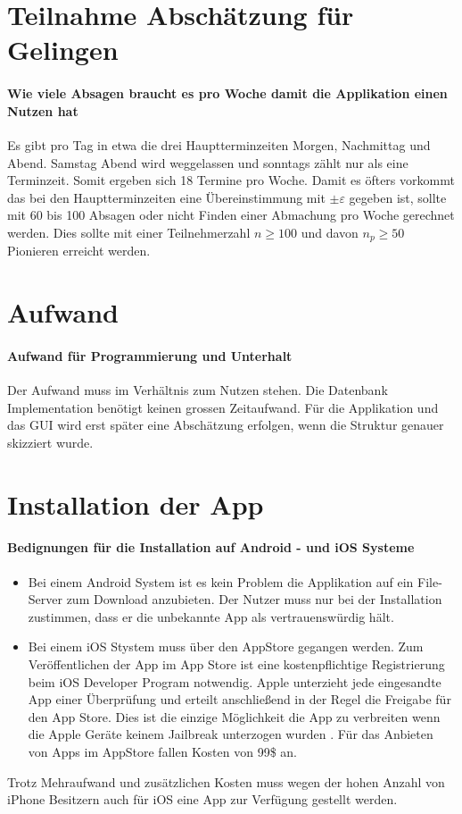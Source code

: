\section{Teilnahme Abschätzung für Gelingen}
\paragraph{Wie viele Absagen braucht es pro Woche damit die Applikation einen Nutzen hat} Es gibt pro Tag in etwa die drei Hauptterminzeiten Morgen, Nachmittag und Abend. Samstag Abend wird weggelassen und sonntags zählt nur als eine Terminzeit. Somit ergeben sich 18 Termine pro Woche. Damit es öfters vorkommt das bei den Hauptterminzeiten eine Übereinstimmung mit $\pm\varepsilon$ gegeben ist, sollte mit 60 bis 100 Absagen oder nicht Finden einer Abmachung pro Woche gerechnet werden. Dies sollte mit einer Teilnehmerzahl $n \geqslant 100$ und davon $n_p \geqslant 50$ Pionieren erreicht werden.

\section{Aufwand}
\paragraph{Aufwand für Programmierung und Unterhalt} Der Aufwand muss im Verhältnis zum Nutzen stehen. Die Datenbank Implementation benötigt keinen grossen Zeitaufwand. Für die Applikation und das GUI wird erst später eine Abschätzung erfolgen, wenn die Struktur genauer skizziert wurde.

\section{Installation der App}
\paragraph{Bedignungen für die Installation auf Android - und iOS Systeme}
\begin{itemize}
\item Bei einem Android System ist es kein Problem die Applikation auf ein File-Server zum Download anzubieten. Der Nutzer muss nur bei der Installation zustimmen, dass er die unbekannte App als vertrauenswürdig hält.
\item Bei einem iOS Stystem muss über den AppStore gegangen werden.  Zum Veröffentlichen der App im App Store ist eine kostenpflichtige Registrierung beim iOS Developer Program notwendig. Apple unterzieht jede eingesandte App einer Überprüfung und erteilt anschließend in der Regel die Freigabe für den App Store. Dies ist die einzige Möglichkeit die App zu verbreiten wenn die Apple Geräte keinem Jailbreak unterzogen wurden \cite{appStore}. Für das Anbieten von Apps im AppStore fallen Kosten von 99\$ an.
\end{itemize}
Trotz Mehraufwand und zusätzlichen Kosten muss wegen der hohen Anzahl von iPhone Besitzern auch für iOS eine App zur Verfügung gestellt werden.

